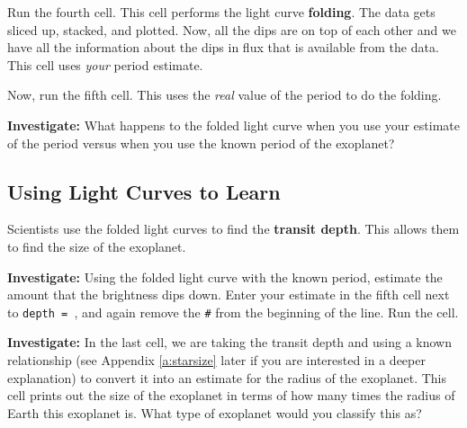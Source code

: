 \documentclass[14pt]{article}
\begin{document}
\vspace{2mm}

\noindent Run the fourth cell. This cell performs the light curve \textbf{folding}. The data gets sliced up, stacked, and plotted. Now, all the dips are on top of each other and we have all the information about the dips in flux that is available from the data. This cell uses \textit{your} period estimate.

\vspace{2mm}

\noindent Now, run the fifth cell. This uses the \textit{real} value of the period to do the folding.

\vspace{2mm}

\noindent\textbf{Investigate:} What happens to the folded light curve when you use your estimate of the period versus when you use the known period of the exoplanet?

\subsection*{Using Light Curves to Learn}

Scientists use the folded light curves to find the \textbf{transit depth}. This allows them to find the size of the exoplanet.

\vspace{2mm}
    
\noindent \textbf{Investigate:} Using the folded light curve with the known period, estimate the amount that the brightness dips down. Enter your estimate in the fifth cell next to \texttt{depth = }, and again remove the \texttt{\#} from the beginning of the line. Run the cell.

\vspace{2mm}
  
\noindent \textbf{Investigate:} In the last cell, we are taking the transit depth and using a known relationship (see Appendix \ref{a:starsize} later if you are interested in a deeper explanation) to convert it into an estimate for the radius of the exoplanet. This cell prints out the size of the exoplanet in terms of how many times the radius of Earth this exoplanet is. What type of exoplanet would you classify this as?

\vspace{10mm}
\end{document}
